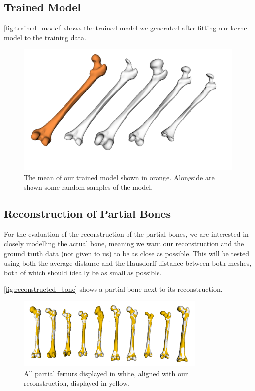 
\subsection{Trained Model}
\label{subsec:trainedmodel}
\autoref{fig:trained_model} shows the trained model we generated after fitting our kernel model to the training data.

\begin{figure}
	\centering
  \includegraphics[width=\columnwidth]{./Figures/interpolated_model_samples}
  \caption{
    The mean of our trained model shown in orange.
    Alongside are shown some random samples of the model.}
  \label{fig:trained_model}
\end{figure}


\subsection{Reconstruction of Partial Bones}
\label{subsec:reconresults}
For the evaluation of the reconstruction of the partial bones, we are interested in closely modelling the actual bone, meaning we want our reconstruction and the ground truth data (not given to us) to be as close as possible. 
This will be tested using both the average distance and the Hausdorff distance between both meshes, both of which should ideally be as small as possible.

\autoref{fig:reconstructed_bone} shows a partial bone next to its reconstruction.

\begin{figure}
	\centering
  \includegraphics[width=0.82\textwidth]{./Figures/reconstruction_summary}
  \caption{All partial femurs displayed in white, aligned with our reconstruction, displayed in yellow.}
  \label{fig:reconstructed_bone}
\end{figure}


